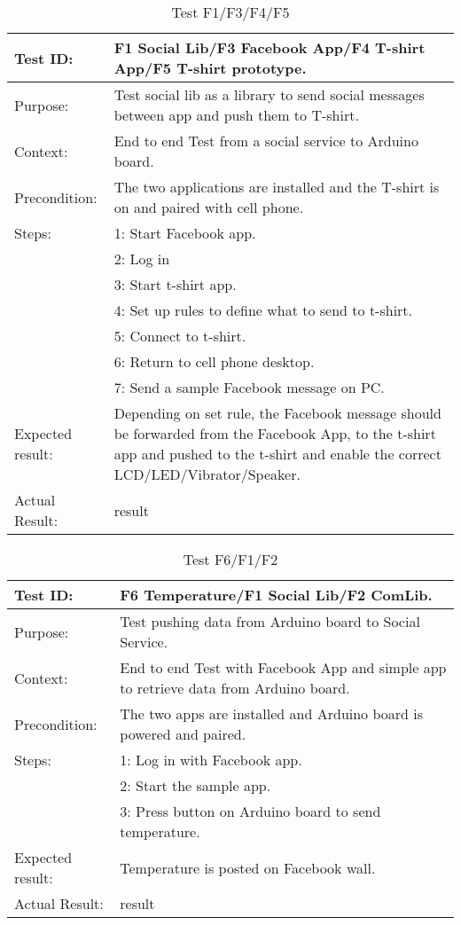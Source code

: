 \begin{table}[h!]
\begin{tabular}{|l|p{10cm}|}
\hline Test ID: & F1 Social Lib/F3 Facebook App/F4 T-shirt App/F5 T-shirt prototype. \\ 
\hline Purpose: & Test social lib as a library to send social messages between app and push them to T-shirt.  \\ 
\hline Context: & End to end Test from a social service to Arduino board. \\ 
\hline Precondition: & The two applications are installed and the T-shirt is on and paired with cell phone. \\ 
\hline
Steps: & 1: Start Facebook app.\\ 
  & 2: Log in \\ 
  & 3: Start t-shirt app. \\ 
  & 4: Set up rules to define what to send to t-shirt. \\
  & 5: Connect to t-shirt. \\
  & 6: Return to cell phone desktop. \\
  & 7: Send a sample Facebook message on PC. \\
  \hline
  Expected result: & Depending on set rule, the Facebook message should be forwarded from the Facebook App, to the t-shirt app and pushed to the t-shirt and enable the correct LCD/LED/Vibrator/Speaker. \\ 
  \hline
Actual Result: &  result \\
  \hline
\end{tabular}
\caption{Test F1/F3/F4/F5}
\label{tbl:f1f3f4f5test}
\end{table}

\begin{table}[h!]
\begin{tabular}{|l|p{10cm}|}
\hline Test ID: & F6 Temperature/F1 Social Lib/F2 ComLib. \\ 
\hline Purpose: & Test pushing data from Arduino board to Social Service.  \\ 
\hline Context: & End to end Test with Facebook App and simple app to retrieve data from Arduino board. \\ 
\hline Precondition: & The two apps are installed and Arduino board is powered and paired. \\ 
\hline
Steps: & 1: Log in with Facebook app.\\ 
  & 2: Start the sample app. \\ 
  & 3: Press button on Arduino board to send temperature. \\ 

  \hline
  Expected result: & Temperature is posted on Facebook wall. \\ 
  \hline
Actual Result: &  result \\
  \hline
\end{tabular}
\caption{Test F6/F1/F2}
\label{tbl:f6f1f2test}
\end{table}

